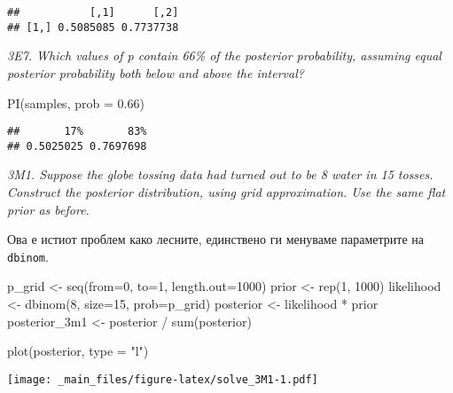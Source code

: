 \documentclass[
]{book}
\newenvironment{Shaded}{\begin{snugshade}}{\end{snugshade}}
\newcommand{\AttributeTok}[1]{\textcolor[rgb]{0.77,0.63,0.00}{#1}}
\newcommand{\DecValTok}[1]{\textcolor[rgb]{0.00,0.00,0.81}{#1}}
\newcommand{\FloatTok}[1]{\textcolor[rgb]{0.00,0.00,0.81}{#1}}
\newcommand{\FunctionTok}[1]{\textcolor[rgb]{0.00,0.00,0.00}{#1}}
\newcommand{\NormalTok}[1]{#1}
\newcommand{\OtherTok}[1]{\textcolor[rgb]{0.56,0.35,0.01}{#1}}
\newcommand{\SpecialCharTok}[1]{\textcolor[rgb]{0.00,0.00,0.00}{#1}}
\newcommand{\StringTok}[1]{\textcolor[rgb]{0.31,0.60,0.02}{#1}}
\begin{document}
\begin{verbatim}
##           [,1]      [,2]
## [1,] 0.5085085 0.7737738
\end{verbatim}

\emph{3E7. Which values of p contain 66\% of the posterior probability, assuming equal posterior probability both below and above the interval?}

\begin{Shaded}
\begin{Highlighting}[]
\FunctionTok{PI}\NormalTok{(samples, }\AttributeTok{prob =} \FloatTok{0.66}\NormalTok{)}
\end{Highlighting}
\end{Shaded}

\begin{verbatim}
##       17%       83% 
## 0.5025025 0.7697698
\end{verbatim}

\emph{3M1. Suppose the globe tossing data had turned out to be 8 water in 15 tosses. Construct the posterior distribution, using grid approximation. Use the same flat prior as before.}

Ова е истиот проблем како лесните, единствено ги менуваме параметрите на \texttt{dbinom}.

\begin{Shaded}
\begin{Highlighting}[]
\NormalTok{p\_grid }\OtherTok{\textless{}{-}} \FunctionTok{seq}\NormalTok{(}\AttributeTok{from=}\DecValTok{0}\NormalTok{, }\AttributeTok{to=}\DecValTok{1}\NormalTok{, }\AttributeTok{length.out=}\DecValTok{1000}\NormalTok{)}
\NormalTok{prior }\OtherTok{\textless{}{-}} \FunctionTok{rep}\NormalTok{(}\DecValTok{1}\NormalTok{, }\DecValTok{1000}\NormalTok{)}
\NormalTok{likelihood }\OtherTok{\textless{}{-}} \FunctionTok{dbinom}\NormalTok{(}\DecValTok{8}\NormalTok{, }\AttributeTok{size=}\DecValTok{15}\NormalTok{, }\AttributeTok{prob=}\NormalTok{p\_grid)}
\NormalTok{posterior }\OtherTok{\textless{}{-}}\NormalTok{ likelihood }\SpecialCharTok{*}\NormalTok{ prior}
\NormalTok{posterior\_3m1 }\OtherTok{\textless{}{-}}\NormalTok{ posterior }\SpecialCharTok{/} \FunctionTok{sum}\NormalTok{(posterior)}

\FunctionTok{plot}\NormalTok{(posterior, }\AttributeTok{type =} \StringTok{"l"}\NormalTok{)}
\end{Highlighting}
\end{Shaded}

\texttt{[image: \_main\_files/figure-latex/solve\_3M1-1.pdf]}
\end{document}
